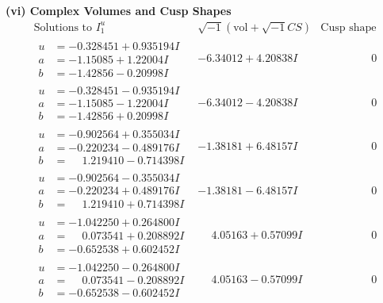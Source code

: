 \documentclass[1p]{elsarticle_modified}
\theoremstyle{definition}
\newcommand{\I}{\sqrt{-1}}
\begin{document}
\newpage\flushleft \textbf{(vi) Complex Volumes and Cusp Shapes}
$$\begin{array}{c|c|c}  
\text{Solutions to }I^u_{1}& \I (\text{vol} + \sqrt{-1}CS) & \text{Cusp shape}\\
 \hline 
\begin{aligned}
u &= -0.328451 + 0.935194 I \\
a &= -1.15085 + 1.22004 I \\
b &= -1.42856 - 0.20998 I\end{aligned}
 & -6.34012 + 4.20838 I & \phantom{-0.000000 } 0 \\ \hline\begin{aligned}
u &= -0.328451 - 0.935194 I \\
a &= -1.15085 - 1.22004 I \\
b &= -1.42856 + 0.20998 I\end{aligned}
 & -6.34012 - 4.20838 I & \phantom{-0.000000 } 0 \\ \hline\begin{aligned}
u &= -0.902564 + 0.355034 I \\
a &= -0.220234 - 0.489176 I \\
b &= \phantom{-}1.219410 - 0.714398 I\end{aligned}
 & -1.38181 + 6.48157 I & \phantom{-0.000000 } 0 \\ \hline\begin{aligned}
u &= -0.902564 - 0.355034 I \\
a &= -0.220234 + 0.489176 I \\
b &= \phantom{-}1.219410 + 0.714398 I\end{aligned}
 & -1.38181 - 6.48157 I & \phantom{-0.000000 } 0 \\ \hline\begin{aligned}
u &= -1.042250 + 0.264800 I \\
a &= \phantom{-}0.073541 + 0.208892 I \\
b &= -0.652538 + 0.602452 I\end{aligned}
 & \phantom{-}4.05163 + 0.57099 I & \phantom{-0.000000 } 0 \\ \hline\begin{aligned}
u &= -1.042250 - 0.264800 I \\
a &= \phantom{-}0.073541 - 0.208892 I \\
b &= -0.652538 - 0.602452 I\end{aligned}
 & \phantom{-}4.05163 - 0.57099 I & \phantom{-0.000000 } 0 \\ \hline\begin{aligned}

\end{aligned}
\end{array}$$
\end{document}
